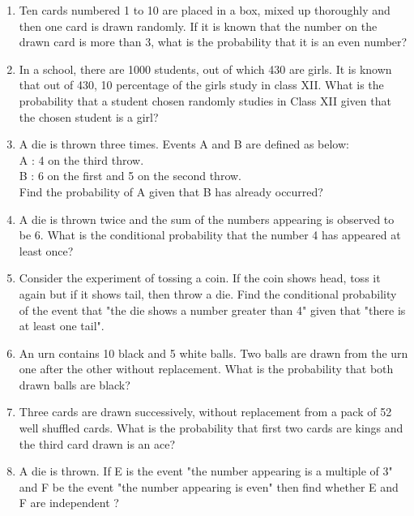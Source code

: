 \begin{enumerate}[label=\arabic*.,ref=\thesubsection.\theenumi]
\item Ten cards numbered 1 to 10 are placed in a box, mixed up thoroughly and then one card is drawn randomly. If it is known that the number on the drawn card is more than 3, what is the probability that it is an even number?\\

\item In a school, there are 1000 students, out of which 430 are girls. It is known that out of 430,  10 percentage of the girls study in class XII. What is the probability that a student chosen randomly studies in Class XII given that the chosen student is a girl?\\

\item A die is thrown three times. Events A and B are defined as below:\\
A : 4 on the third throw.\\
B : 6 on the first and 5 on the second throw.\\
Find the probability of A given that B has already occurred?\\

\item A die is thrown twice and the sum of the numbers appearing is observed to be 6. What is the conditional probability that the number 4 has appeared at least once?\\

\item Consider the experiment of tossing a coin. If the coin shows head, toss it again but if it shows tail, then throw a die. Find the conditional probability of the event that "the die shows a number greater than 4" given that "there is at least one tail".\\

\item An urn contains 10 black and 5 white balls. Two balls are drawn from the urn one after the other without replacement. What is the probability that both drawn balls are black?\\

\item Three cards are drawn successively, without replacement from a pack of 52 well shuffled cards. What is the probability that first two cards are kings and the third card drawn is an ace?\\

\item A die is thrown. If E is the event "the number appearing is a multiple of 3" and F be the event "the number appearing is even" then find whether E and F are independent ?\\


\end{enumerate}
